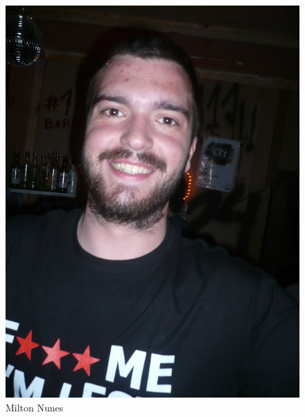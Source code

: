 \documentclass[a4paper,11pt,openright,openbib]{report}
\begin{document}
\begin{figure}[!htb]
     \centering
     \includegraphics[scale=0.1]{imagens/mfn.jpg}
     \caption{Milton Nunes}
     \label{Milton Nunes}
\end{figure}
\end{document}
